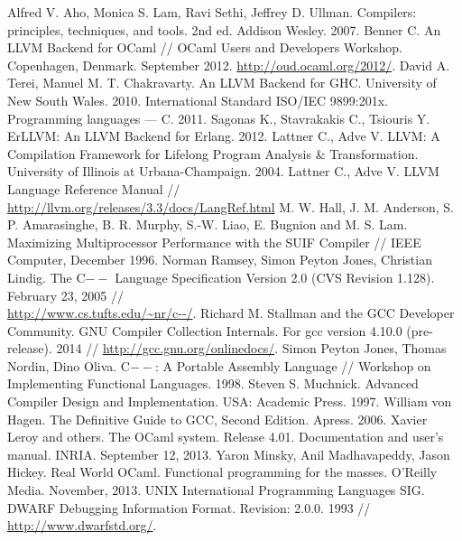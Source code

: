 \documentclass[a4paper, 12pt]{article}
\begin{document}
\newpage
{}
\begin{thebibliography}{9001}

   Alfred V. Aho, Monica S. Lam, Ravi Sethi, Jeffrey D. Ullman. Compilers: principles, techniques, and
tools. 2nd ed. Addison Wesley. 2007.
   Benner C. An LLVM Backend for OCaml // OCaml Users and Developers Workshop. Copenhagen, Denmark.
September 2012. \url{http://oud.ocaml.org/2012/}.
   David A. Terei, Manuel M. T. Chakravarty. An LLVM Backend for GHC. University of New South Wales. 2010.
   International Standard ISO/IEC 9899:201x. Programming languages — C. 2011.
   Sagonas K., Stavrakakis C., Tsiouris Y. ErLLVM: An LLVM Backend for Erlang. 2012.
   Lattner C., Adve V. LLVM: A Compilation Framework for Lifelong Program Analysis \& Transformation.
University of Illinois at Urbana-Champaign. 2004.
   Lattner C., Adve V. LLVM Language Reference Manual // \\
\url{http://llvm.org/releases/3.3/docs/LangRef.html}
   M. W. Hall, J. M. Anderson, S. P. Amarasinghe, B. R. Murphy, S.-W. Liao, E. Bugnion and M. S. Lam.
Maximizing Multiprocessor Performance with the SUIF Compiler // IEEE Computer, December 1996.
   Norman Ramsey, Simon Peyton Jones, Christian Lindig. The C$--$ Language Specification Version 2.0
(CVS Revision 1.128). February 23, 2005 // \\ \url{http://www.cs.tufts.edu/~nr/c--/}.
   Richard M. Stallman and the GCC Developer Community. GNU Compiler Collection Internals. For gcc
version 4.10.0 (pre-release). 2014 // \url{http://gcc.gnu.org/onlinedocs/}.
   Simon Peyton Jones, Thomas Nordin, Dino Oliva. C$--$: A Portable Assembly Language // Workshop on
Implementing Functional Languages. 1998.
   Steven S. Muchnick. Advanced Compiler Design and Implementation. USA: Academic Press. 1997.
   William von Hagen. The Definitive Guide to GCC, Second Edition. Apress. 2006.
   Xavier Leroy and others. The OCaml system. Release 4.01. Documentation and user's manual. INRIA.
September 12, 2013.
   Yaron Minsky, Anil Madhavapeddy, Jason Hickey. Real World OCaml. Functional programming for the masses.
O'Reilly Media. November, 2013.
   UNIX International Programming Languages SIG. DWARF Debugging Information Format. Revision: 2.0.0.
1993 // \url{http://www.dwarfstd.org/}.

\end{thebibliography}

\newpage
\end{document}
